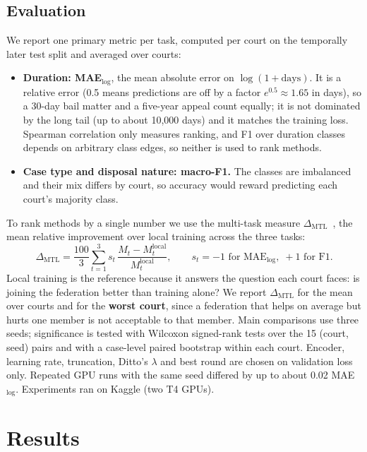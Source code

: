 \documentclass[11pt,a4paper]{article}
\newcommand{\dmtl}{\Delta_{\text{MTL}}}
\newcommand{\mae}{MAE$_{\log}$}
\begin{document}
\subsection{Evaluation}
We report one primary metric per task, computed per court on the temporally later test split and
averaged over courts:
\begin{itemize}
  \item \textbf{Duration: \mae{}}, the mean absolute error on $\log(1+\text{days})$. It is a relative
        error (0.5 means predictions are off by a factor $e^{0.5}\approx1.65$ in days), so a 30-day
        bail matter and a five-year appeal count equally; it is not dominated by the long tail (up to
        about 10,000 days) and it matches the training loss. Spearman correlation only measures
        ranking, and F1 over duration classes depends on arbitrary class edges, so neither is used
        to rank methods.
  \item \textbf{Case type and disposal nature: macro-F1.} The classes are imbalanced and their mix
        differs by court, so accuracy would reward predicting each court's majority class.
\end{itemize}
To rank methods by a single number we use the multi-task measure $\dmtl$~\cite{maninis2019attentive,vandenhende2021mtl},
the mean relative improvement over local training across the three tasks:
\begin{equation}
\dmtl = \frac{100}{3}\sum_{t=1}^{3} s_t\,\frac{M_t - M_t^{\text{local}}}{M_t^{\text{local}}},\qquad
s_t=-1 \text{ for \mae{}},\; +1 \text{ for F1}.
\end{equation}
Local training is the reference because it answers the question each court faces: is joining the
federation better than training alone? We report $\dmtl$ for the mean over courts and for the
\textbf{worst court}, since a federation that helps on average but hurts one member is not acceptable to
that member. Main comparisons use three seeds; significance is tested with Wilcoxon signed-rank tests
over the 15 (court, seed) pairs and with a case-level paired bootstrap within each court. Encoder,
learning rate, truncation, Ditto's $\lambda$ and best round are chosen on validation loss only.
Repeated GPU runs with the same seed differed by up to about 0.02 \mae{}. Experiments ran on Kaggle
(two T4 GPUs).

\section{Results}
\label{sec:results}
\end{document}
